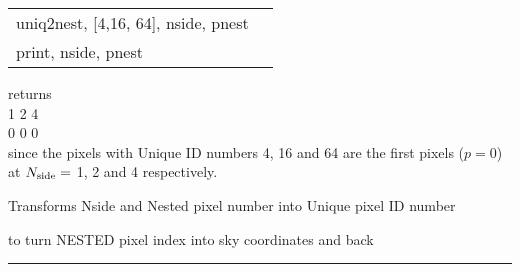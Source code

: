 \begin{example}
{
\begin{tabular}{ll} %
uniq2nest, [4,16, 64], nside, pnest\\
print, nside, pnest
\end{tabular}
}
{
\begin{minipage}{11cm}
returns  \\
   1 \hskip 1cm 2 \hskip 1cm 4 \\
   0 \hskip 1cm 0 \hskip 1cm 0 \\
since the pixels with Unique ID numbers 4, 16 and 64 are the first pixels ($p=0$) at $N_{\rm side}=$ 1, 2 and 4 respectively.
\end{minipage}
}
\end{example}


\begin{related}
  \begin{sulist}{} %
  \item[\htmlref{nest2uniq}{idl:nest2uniq}] Transforms Nside and Nested pixel number into Unique \healpix pixel ID number
  \item[\htmlref{pix2xxx, ...}{idl:pix_tools}] to turn NESTED pixel index into sky coordinates and back
  \end{sulist}
\end{related}

\rule{\hsize}{2mm}

